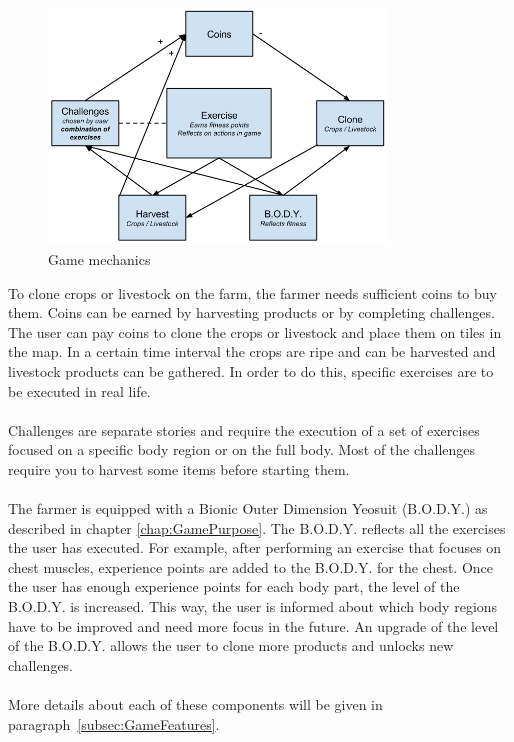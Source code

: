 \begin{figure}[h]
	\centering
		\includegraphics[width=0.80\textwidth]{images/gameconcept.png}
	\caption{Game mechanics}
	\label{fig:gameconcept}
\end{figure}

To clone crops or livestock on the farm, the farmer needs sufficient coins to buy them. Coins can be earned by harvesting products or by completing challenges. The user can pay coins to clone the crops or livestock and place them on tiles in the map. In a certain time interval the crops are ripe and can be harvested and livestock products can be gathered. In order to do this, specific exercises are to be executed in real life. 
\\\\
Challenges are separate stories and require the execution of a set of exercises focused on a specific body region or on the full body. Most of the challenges require you to harvest some items before starting them.
\\\\
The farmer is equipped with a Bionic Outer Dimension Yeosuit (B.O.D.Y.) as described in chapter \ref{chap:GamePurpose}. The B.O.D.Y. reflects all the exercises the user has executed. For example, after performing an exercise that focuses on chest muscles, experience points are added to the B.O.D.Y. for the chest. Once the user has enough experience points for each body part, the level of the B.O.D.Y. is increased. This way, the user is informed about which body regions have to be improved and need more focus in the future. An upgrade of the level of the B.O.D.Y. allows the user to clone more products and unlocks new challenges.
\\\\
More details about each of these components will be given in paragraph~\ref{subsec:GameFeatures}.

